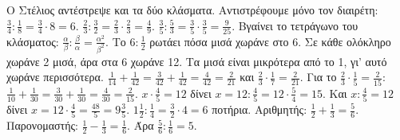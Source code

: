  Ο Στέλιος αντέστρεψε και τα δύο κλάσματα. Αντιστρέφουμε μόνο τον διαιρέτη: $\frac{3}{4}:\frac{1}{8}=\frac{3}{4}\cdot 8=6$.
 $\frac{2}{3}:\frac{3}{2}=\frac{2}{3}\cdot\frac{2}{3}=\frac{4}{9}$. $\frac{3}{5}:\frac{5}{3}=\frac{3}{5}\cdot\frac{3}{5}=\frac{9}{25}$. Βγαίνει το τετράγωνο του κλάσματος: $\frac{\alpha}{\beta}:\frac{\beta}{\alpha}=\frac{\alpha^2}{\beta^2}$.
 Το $6:\frac{1}{2}$ ρωτάει πόσα μισά χωράνε στο 6. Σε κάθε ολόκληρο χωράνε 2 μισά, άρα στα 6 χωράνε 12. Τα μισά είναι μικρότερα από το 1, γι' αυτό χωράνε περισσότερα.
 $\frac{1}{14}+\frac{1}{42}=\frac{3}{42}+\frac{1}{42}=\frac{4}{42}=\frac{2}{21}$ και $\frac{2}{3}\cdot\frac{1}{7}=\frac{2}{21}$. Για το $\frac{2}{3}\cdot\frac{1}{5}=\frac{2}{15}$: $\frac{1}{10}+\frac{1}{30}=\frac{3}{30}+\frac{1}{30}=\frac{4}{30}=\frac{2}{15}$.
 $x\cdot\frac{4}{5}=12$ δίνει $x=12:\frac{4}{5}=12\cdot\frac{5}{4}=15$. Και $x:\frac{4}{5}=12$ δίνει $x=12\cdot\frac{4}{5}=\frac{48}{5}=9\frac{3}{5}$.
 $1\frac{1}{2}:\frac{1}{4}=\frac{3}{2}\cdot 4=6$ ποτήρια.
 Αριθμητής: $\frac{1}{2}+\frac{1}{3}=\frac{5}{6}$. Παρονομαστής: $\frac{1}{2}-\frac{1}{3}=\frac{1}{6}$. Άρα $\frac{5}{6}:\frac{1}{6}=5$.
